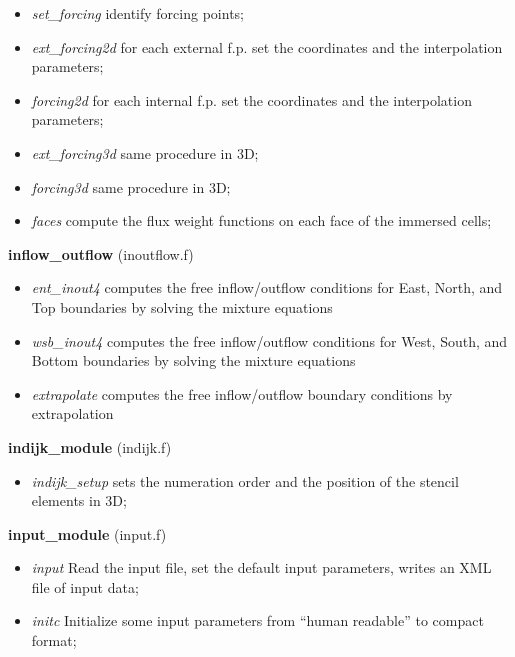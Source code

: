 \begin{itemize}
\item{\em set\_forcing} identify forcing points;
\item{\em ext\_forcing2d} for each external f.p. set the coordinates and the interpolation parameters;
\item{\em forcing2d} for each internal f.p. set the coordinates and the interpolation parameters;
\item{\em ext\_forcing3d} same procedure in 3D;
\item{\em forcing3d} same procedure in 3D;
\item{\em faces} compute the flux weight functions on each face of the immersed cells;
\end{itemize}
%
%
{\large {\bf inflow\_outflow}} (inoutflow.f)\\
\begin{itemize}
\item {\em ent\_inout4} computes the free inflow/outflow conditions for East, North, and Top boundaries
  by solving the mixture equations
\item {\em wsb\_inout4} computes the free inflow/outflow conditions for West, South, and Bottom boundaries
  by solving the mixture equations
\item {\em extrapolate} computes the free inflow/outflow boundary conditions by extrapolation
\end{itemize}
%
%
{\large{\bf indijk\_module}} (indijk.f) \\
\begin{itemize}
\item{\em indijk\_setup} sets the numeration order and the position of the stencil elements in 3D;
\end{itemize}
%
%
{\large{\bf input\_module}} (input.f)\\
\begin{itemize}
\item{\em input} Read the input file, set the default input parameters, writes an XML file of input data;
\item{\em initc} Initialize some input parameters from ``human readable'' to compact format;
\end{itemize}
%
